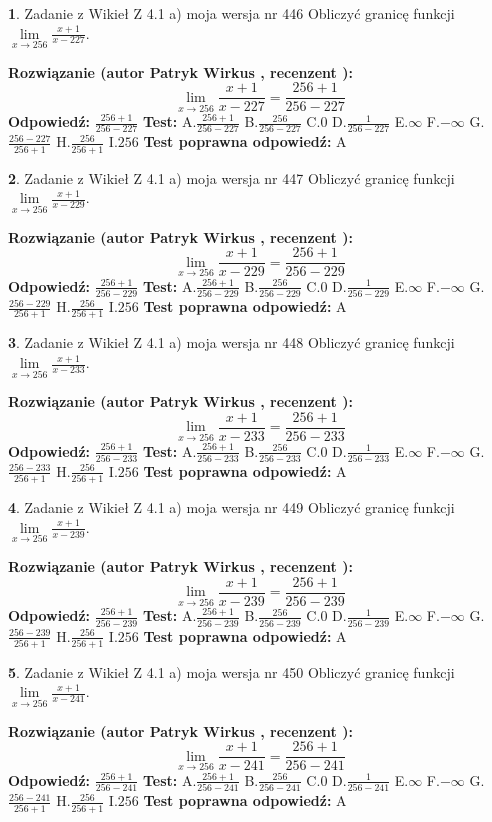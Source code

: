 \documentclass[12pt, a4paper]{article}
\theoremstyle{definition} %
\newtheorem{zad}{}
\newcommand{\zadStart}[1]{\begin{zad}#1\newline}
\newcommand{\zadStop}{\end{zad}}
\newcommand{\rozwStart}[2]{\noindent \textbf{Rozwiązanie (autor #1 , recenzent #2): }\newline}
\newcommand{\rozwStop}{\newline}
\newcommand{\odpStart}{\noindent \textbf{Odpowiedź:}\newline}
\newcommand{\odpStop}{\newline}
\newcommand{\testStart}{\noindent \textbf{Test:}\newline}
\newcommand{\testStop}{\newline}
\newcommand{\kluczStart}{\noindent \textbf{Test poprawna odpowiedź:}\newline}
\newcommand{\kluczStop}{\newline}
\begin{document}
\zadStart{Zadanie z Wikieł Z 4.1 a) moja wersja nr 446}
Obliczyć granicę funkcji $\lim\limits_{x\to256}\frac{x+1}{x-227}$.
\zadStop
\rozwStart{Patryk Wirkus}{}
$$\lim\limits_{x\to256}\frac{x+1}{x-227} = \frac{256+1}{256-227}$$
\rozwStop
\odpStart
$\frac{256+1}{256-227}$
\odpStop
\testStart
A.$\frac{256+1}{256-227}$
B.$\frac{256}{256-227}$
C.$0$
D.$\frac{1}{256-227}$
E.$\infty$
F.$-\infty$
G.$\frac{256-227}{256+1}$
H.$\frac{256}{256+1}$
I.$256$
\testStop
\kluczStart
A
\kluczStop



\zadStart{Zadanie z Wikieł Z 4.1 a) moja wersja nr 447}
Obliczyć granicę funkcji $\lim\limits_{x\to256}\frac{x+1}{x-229}$.
\zadStop
\rozwStart{Patryk Wirkus}{}
$$\lim\limits_{x\to256}\frac{x+1}{x-229} = \frac{256+1}{256-229}$$
\rozwStop
\odpStart
$\frac{256+1}{256-229}$
\odpStop
\testStart
A.$\frac{256+1}{256-229}$
B.$\frac{256}{256-229}$
C.$0$
D.$\frac{1}{256-229}$
E.$\infty$
F.$-\infty$
G.$\frac{256-229}{256+1}$
H.$\frac{256}{256+1}$
I.$256$
\testStop
\kluczStart
A
\kluczStop



\zadStart{Zadanie z Wikieł Z 4.1 a) moja wersja nr 448}
Obliczyć granicę funkcji $\lim\limits_{x\to256}\frac{x+1}{x-233}$.
\zadStop
\rozwStart{Patryk Wirkus}{}
$$\lim\limits_{x\to256}\frac{x+1}{x-233} = \frac{256+1}{256-233}$$
\rozwStop
\odpStart
$\frac{256+1}{256-233}$
\odpStop
\testStart
A.$\frac{256+1}{256-233}$
B.$\frac{256}{256-233}$
C.$0$
D.$\frac{1}{256-233}$
E.$\infty$
F.$-\infty$
G.$\frac{256-233}{256+1}$
H.$\frac{256}{256+1}$
I.$256$
\testStop
\kluczStart
A
\kluczStop



\zadStart{Zadanie z Wikieł Z 4.1 a) moja wersja nr 449}
Obliczyć granicę funkcji $\lim\limits_{x\to256}\frac{x+1}{x-239}$.
\zadStop
\rozwStart{Patryk Wirkus}{}
$$\lim\limits_{x\to256}\frac{x+1}{x-239} = \frac{256+1}{256-239}$$
\rozwStop
\odpStart
$\frac{256+1}{256-239}$
\odpStop
\testStart
A.$\frac{256+1}{256-239}$
B.$\frac{256}{256-239}$
C.$0$
D.$\frac{1}{256-239}$
E.$\infty$
F.$-\infty$
G.$\frac{256-239}{256+1}$
H.$\frac{256}{256+1}$
I.$256$
\testStop
\kluczStart
A
\kluczStop



\zadStart{Zadanie z Wikieł Z 4.1 a) moja wersja nr 450}
Obliczyć granicę funkcji $\lim\limits_{x\to256}\frac{x+1}{x-241}$.
\zadStop
\rozwStart{Patryk Wirkus}{}
$$\lim\limits_{x\to256}\frac{x+1}{x-241} = \frac{256+1}{256-241}$$
\rozwStop
\odpStart
$\frac{256+1}{256-241}$
\odpStop
\testStart
A.$\frac{256+1}{256-241}$
B.$\frac{256}{256-241}$
C.$0$
D.$\frac{1}{256-241}$
E.$\infty$
F.$-\infty$
G.$\frac{256-241}{256+1}$
H.$\frac{256}{256+1}$
I.$256$
\testStop
\kluczStart
A
\kluczStop
\end{document}
